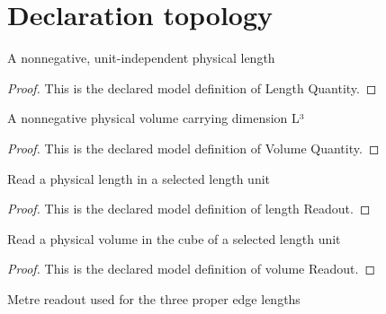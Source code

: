 \section{Declaration topology}
\begin{definition}
  \label{def:physics:phyx-mini-0559:phyxminiproblems-problemphyxmini0559-lengthquantity}
  A nonnegative, unit-independent physical length
\end{definition}
\begin{proof}
  This is the declared model definition of Length Quantity.
\end{proof}
\begin{definition}
  \label{def:physics:phyx-mini-0559:phyxminiproblems-problemphyxmini0559-volumequantity}
  A nonnegative physical volume carrying dimension L³
\end{definition}
\begin{proof}
  This is the declared model definition of Volume Quantity.
\end{proof}
\begin{definition}
  \label{def:physics:phyx-mini-0559:phyxminiproblems-problemphyxmini0559-lengthreadout}
  Read a physical length in a selected length unit
\end{definition}
\begin{proof}
  This is the declared model definition of length Readout.
\end{proof}
\begin{definition}
  \label{def:physics:phyx-mini-0559:phyxminiproblems-problemphyxmini0559-volumereadout}
  Read a physical volume in the cube of a selected length unit
\end{definition}
\begin{proof}
  This is the declared model definition of volume Readout.
\end{proof}
\begin{definition}
  \label{def:physics:phyx-mini-0559:phyxminiproblems-problemphyxmini0559-lengthinmeters}
  Metre readout used for the three proper edge lengths
\end{definition}
